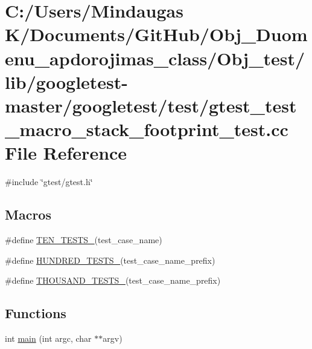 \hypertarget{_obj__test_2lib_2googletest-master_2googletest_2test_2gtest__test__macro__stack__footprint__test_8cc}{}\section{C\+:/\+Users/\+Mindaugas K/\+Documents/\+Git\+Hub/\+Obj\+\_\+\+Duomenu\+\_\+apdorojimas\+\_\+class/\+Obj\+\_\+test/lib/googletest-\/master/googletest/test/gtest\+\_\+test\+\_\+macro\+\_\+stack\+\_\+footprint\+\_\+test.cc File Reference}
\label{_obj__test_2lib_2googletest-master_2googletest_2test_2gtest__test__macro__stack__footprint__test_8cc}
{\ttfamily \#include \char`\"{}gtest/gtest.\+h\char`\"{}}\newline
\subsection*{Macros}
\begin{DoxyCompactItemize}
\item 
\#define \mbox{\hyperlink{_obj__test_2lib_2googletest-master_2googletest_2test_2gtest__test__macro__stack__footprint__test_8cc_a5ec4fbf93965ff2608810fa9fa15d824}{T\+E\+N\+\_\+\+T\+E\+S\+T\+S\+\_\+}}(test\+\_\+case\+\_\+name)
\item 
\#define \mbox{\hyperlink{_obj__test_2lib_2googletest-master_2googletest_2test_2gtest__test__macro__stack__footprint__test_8cc_a27c403ca1878ce98fe3268318abee273}{H\+U\+N\+D\+R\+E\+D\+\_\+\+T\+E\+S\+T\+S\+\_\+}}(test\+\_\+case\+\_\+name\+\_\+prefix)
\item 
\#define \mbox{\hyperlink{_obj__test_2lib_2googletest-master_2googletest_2test_2gtest__test__macro__stack__footprint__test_8cc_a9671fd1d134f54e8295001098cff7810}{T\+H\+O\+U\+S\+A\+N\+D\+\_\+\+T\+E\+S\+T\+S\+\_\+}}(test\+\_\+case\+\_\+name\+\_\+prefix)
\end{DoxyCompactItemize}
\subsection*{Functions}
\begin{DoxyCompactItemize}
\item 
int \mbox{\hyperlink{_obj__test_2lib_2googletest-master_2googletest_2test_2gtest__test__macro__stack__footprint__test_8cc_a3c04138a5bfe5d72780bb7e82a18e627}{main}} (int argc, char $\ast$$\ast$argv)
\end{DoxyCompactItemize}


